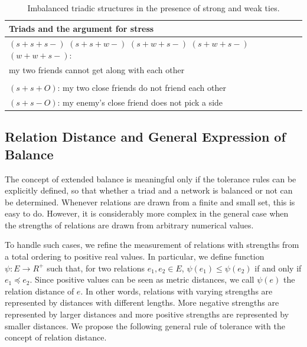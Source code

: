 \begin{table}[htbp!]
\begin{center}
 \begin{tabular}{p{3in}}
Triads and  the argument for stress \\ \hline
$(s+ s+ s-)$ $(s+ s+ w-)$ $(s+ w+ s-)$ $(s+ w+ s-)$ $(w+ w+ s-):$ \\
my two friends cannot get along with each other \\ \\

$(s+ s+ O)$: my two close friends do not friend each other \\ 
$(s+ s- O)$: my enemy's close friend does not pick a side\\ 
\end{tabular} \vspace{4mm}
\caption{\label{tab:imbalanced_extended}Imbalanced triadic structures
  in the presence of strong and weak ties.} 
\end{center}
\end{table}
\vspace*{0in}

\subsection{Relation Distance and General Expression of Balance}
The concept of extended balance is meaningful only if the tolerance
rules can be explicitly defined, so that whether a triad and a network
is balanced or not can be determined. Whenever relations
are drawn from a finite and small set, this is easy to do. However, it
is considerably more complex in the general case when the strengths
of relations are drawn from arbitrary numerical values. 

To handle such cases, we refine the measurement of relations with
strengths from a total ordering to positive real values. In
particular, we define function $\psi: E \rightarrow R^{+}$ such that,
for two relations $e_{1}, e_{2} \in E$, $\psi(e_{1}) \leq \psi(e_{2})$
if and only if $e_{1} \preceq e_{2}$.  Since positive values can be
seen as metric distances, we call $\psi(e)$ the relation distance of
$e$.  In other words, relations with varying strengths are represented
by distances with different lengths.  More negative strengths are
represented by larger distances and more positive strengths are
represented by smaller distances. We propose the following general
rule of tolerance with the concept of relation distance.



